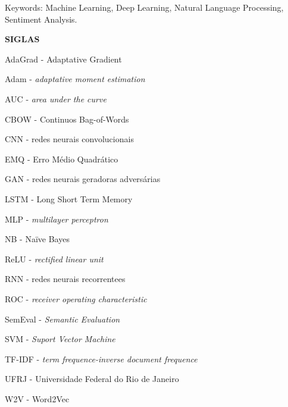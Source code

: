 \vspace{1.0cm}

\noindent Keywords: Machine Learning, Deep Learning, Natural Language Processing, Sentiment Analysis.

\pagebreak

\begin{center}
\textbf{SIGLAS}
\end{center}
\vspace{0.5cm}

AdaGrad - Adaptative Gradient

Adam - \textit{adaptative moment estimation}

AUC - \textit{area under the curve}

CBOW - Continuos Bag-of-Words

CNN - redes neurais convolucionais

EMQ - Erro Médio Quadrático

GAN - redes neurais geradoras adversárias

LSTM - Long Short Term Memory

MLP - \textit{multilayer perceptron}

NB - Naïve Bayes

ReLU - \textit{rectified linear unit}

RNN - redes neurais recorrentees

ROC - \textit{receiver operating characteristic}

SemEval - \textit{Semantic Evaluation}

SVM - \textit{Suport Vector Machine}

TF-IDF - \textit{term frequence-inverse document frequence}

UFRJ - Universidade Federal do Rio de Janeiro

W2V - Word2Vec

\pagebreak

